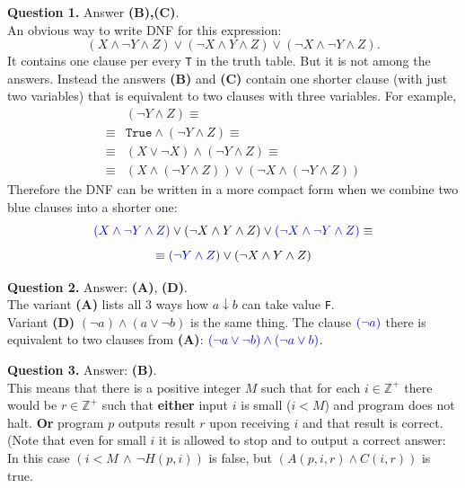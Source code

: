 \documentclass[jou]{apa6}
\begin{document}
\vspace{6pt}
{\bf Question 1.} Answer {\bf (B),(C)}.\\
An obvious way to write DNF for this expression:
$$(X \wedge \neg Y \wedge Z) \vee (\neg X \wedge Y \wedge Z) \vee (\neg X \wedge \neg Y \wedge Z).$$
It contains one clause per every {\tt T} in the truth table. But it is not among the 
answers. Instead the answers {\bf (B)} and {\bf (C)} contain one shorter clause (with just two variables) that 
is equivalent to two clauses with three variables. For example, 
\begin{align}
 & (\neg Y \wedge Z) \equiv \nonumber \\
\equiv & \mathtt{True} \wedge (\neg Y \wedge Z) \equiv \nonumber \\
\equiv & (X \vee \neg X) \wedge (\neg Y \wedge Z) \equiv \nonumber \\
\equiv & (X \wedge (\neg Y \wedge Z)) \vee (\neg X \wedge (\neg Y \wedge Z)) \nonumber
\end{align}
Therefore the DNF can be written in a more compact form when we combine two blue clauses into
a shorter one:
$$\textcolor{blue}{(X \wedge \neg Y \wedge Z)} \vee (\neg X \wedge Y \wedge Z) \vee \textcolor{blue}{(\neg X \wedge \neg Y \wedge Z)} \equiv$$
$$\equiv \textcolor{blue}{(\neg Y \wedge Z)} \vee (\neg X \wedge Y \wedge Z)$$

\vspace{6pt}
{\bf Question 2.} Answer: {\bf (A)}, {\bf (D)}.\\
The variant {\bf (A)} lists all $3$ ways how $a \downarrow b$ can take value {\tt F}.\\
Variant {\bf (D)} $(\neg a) \wedge (a \vee \neg b)$ is the same thing. The clause $\textcolor{blue}{(\neg a)}$ 
there is equivalent to two clauses from {\bf (A)}: $\textcolor{blue}{(\neg a \vee \neg b) \wedge (\neg a \vee b)}$.

\vspace{6pt}
{\bf Question 3.} Answer: {\bf (B)}.\\
This means that there is a positive integer $M$ such that
for each $i \in \mathbb{Z}^{+}$ there would be $r \in \mathbb{Z}^{+}$ such that 
{\bf either} input $i$ is small ($i < M$) and program does not halt. 
{\bf Or} program $p$ outputs result $r$ upon receiving $i$ and 
that result is correct. (Note that even for small $i$ it is allowed
to stop and to output a correct answer: In this case $(i < M \,\wedge\, \neg H(p,i))$ is false, 
but $(A(p,i,r) \wedge C(i,r))$ is true.
\end{document}
